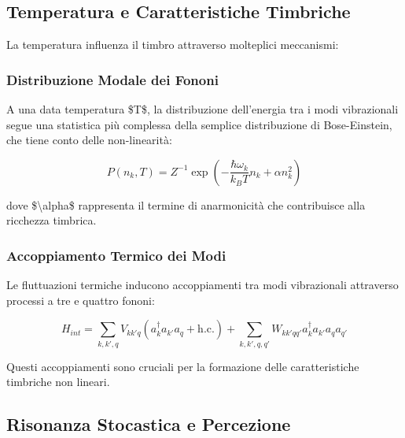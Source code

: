 \documentclass[a4paper,11pt]{article}
\begin{document}
\subsection{Temperatura e Caratteristiche Timbriche}\hypertarget{temperatura-e-caratteristiche-timbriche}{}\label{temperatura-e-caratteristiche-timbriche}

La temperatura influenza il timbro attraverso molteplici meccanismi:

\subsubsection{Distribuzione Modale dei Fononi}\hypertarget{distribuzione-modale-dei-fononi}{}\label{distribuzione-modale-dei-fononi}

A una data temperatura \$T\$, la distribuzione dell'energia tra i modi
vibrazionali segue una statistica più complessa della semplice
distribuzione di Bose-Einstein, che tiene conto delle non-linearità:

\begin{displaymath}
P(n_k, T) = Z^{-1}\exp\left(-\frac{\hbar\omega_k}{k_BT}n_k + \alpha n_k^2\right)
\end{displaymath}

dove \$\textbackslash{}alpha\$ rappresenta il termine di anarmonicità che contribuisce
alla ricchezza timbrica.

\subsubsection{Accoppiamento Termico dei Modi}\hypertarget{accoppiamento-termico-dei-modi}{}\label{accoppiamento-termico-dei-modi}

Le fluttuazioni termiche inducono accoppiamenti tra modi vibrazionali
attraverso processi a tre e quattro fononi:

\begin{displaymath}
H_{int} = \sum_{k,k',q} V_{kk'q}(a_k^\dagger a_{k'} a_q + \text{h.c.}) +
    \sum_{k,k',q,q'} W_{kk'qq'}a_k^\dagger a_{k'} a_q a_{q'}
\end{displaymath}

Questi accoppiamenti sono cruciali per la formazione delle
caratteristiche timbriche non lineari.

\subsection{Risonanza Stocastica e Percezione}\hypertarget{risonanza-stocastica-e-percezione}{}\label{risonanza-stocastica-e-percezione}
\end{document}
